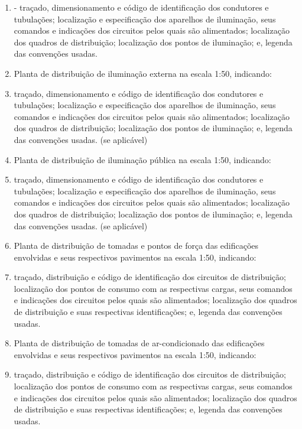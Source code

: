 \begin{enumerate}
	\item - traçado, dimensionamento e código de identificação dos condutores e tubulações; localização e especificação dos aparelhos de iluminação, seus comandos e indicações dos circuitos pelos quais são alimentados; localização dos quadros de distribuição; localização dos pontos de iluminação; e, legenda das convenções usadas.

	\item Planta de distribuição de iluminação externa na escala 1:50,  indicando: 

	\item traçado, dimensionamento e código de identificação dos condutores e tubulações; localização e especificação dos aparelhos de iluminação, seus comandos e indicações dos circuitos pelos quais são alimentados; localização dos quadros de distribuição; localização dos pontos de iluminação; e, legenda das convenções usadas. (se aplicável)

	\item Planta de distribuição de iluminação pública na escala 1:50,  indicando: 

	\item traçado, dimensionamento e código de identificação dos condutores e tubulações; localização e especificação dos aparelhos de iluminação, seus comandos e indicações dos circuitos pelos quais são alimentados; localização dos quadros de distribuição; localização dos pontos de iluminação; e, legenda das convenções usadas. (se aplicável)

	\item Planta de distribuição de tomadas e pontos de força das edificações envolvidas e seus respectivos pavimentos na escala 1:50, indicando: 

	\item traçado, distribuição e código de identificação dos circuitos de distribuição; localização dos pontos de consumo com as respectivas cargas, seus comandos e indicações dos circuitos pelos quais são alimentados; localização dos quadros de distribuição e suas respectivas identificações; e, legenda das convenções usadas.

	\item Planta de distribuição de tomadas de ar-condicionado das edificações envolvidas e seus respectivos pavimentos na escala 1:50, indicando: 

	\item traçado, distribuição e código de identificação dos circuitos de distribuição; localização dos pontos de consumo com as respectivas cargas, seus comandos e indicações dos circuitos pelos quais são alimentados; localização dos quadros de distribuição e suas respectivas identificações; e, legenda das convenções usadas.


\end{enumerate}
